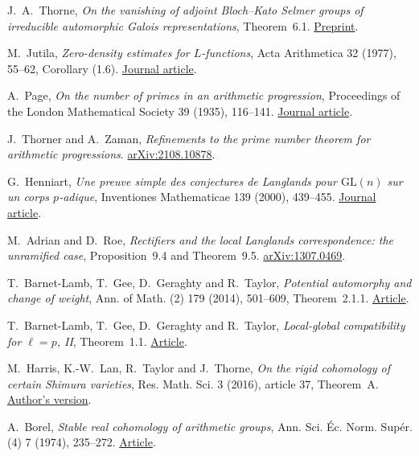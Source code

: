 J.~A.~Thorne, \emph{On the vanishing of adjoint Bloch--Kato
Selmer groups of irreducible automorphic Galois representations},
Theorem~6.1.
\href{https://arxiv.org/abs/2207.04925}{Preprint}.

M.~Jutila, \emph{Zero-density estimates for \(L\)-functions},
Acta Arithmetica 32 (1977), 55--62, Corollary (1.6).
\href{https://matwbn.icm.edu.pl/ksiazki/aa/aa32/aa3216.pdf}{Journal article}.

A.~Page, \emph{On the number of primes in an arithmetic progression},
Proceedings of the London Mathematical Society 39 (1935), 116--141.
\href{https://doi.org/10.1112/plms/s2-39.1.116}{Journal article}.

J.~Thorner and A.~Zaman, \emph{Refinements to the prime number theorem
for arithmetic progressions}.
\href{https://arxiv.org/abs/2108.10878}{arXiv:2108.10878}.

G.~Henniart, \emph{Une preuve simple des conjectures de Langlands pour
\(\mathrm{GL}(n)\) sur un corps \(p\)-adique}, Inventiones
Mathematicae 139 (2000), 439--455.
\href{https://doi.org/10.1007/s002220050012}{Journal article}.

M.~Adrian and D.~Roe, \emph{Rectifiers and the local Langlands
correspondence: the unramified case}, Proposition~9.4 and Theorem~9.5.
\href{https://arxiv.org/abs/1307.0469}{arXiv:1307.0469}.

T.~Barnet-Lamb, T.~Gee, D.~Geraghty and R.~Taylor,
\emph{Potential automorphy and change of weight},
Ann. of Math. (2) 179 (2014), 501--609, Theorem~2.1.1.
\href{https://annals.math.princeton.edu/wp-content/uploads/annals-v179-n2-p03-p.pdf#page=38}{Article}.

T.~Barnet-Lamb, T.~Gee, D.~Geraghty and R.~Taylor,
\emph{Local-global compatibility for \(\ell=p\), II}, Theorem~1.1.
\href{https://virtualmath1.stanford.edu/~rltaylor/lg2.pdf#page=6}{Article}.

M.~Harris, K.-W.~Lan, R.~Taylor and J.~Thorne,
\emph{On the rigid cohomology of certain Shimura varieties},
Res. Math. Sci. 3 (2016), article 37, Theorem~A.
\href{https://arxiv.org/abs/1411.6717}{Author's version}.

A.~Borel, \emph{Stable real cohomology of arithmetic groups},
Ann. Sci. \'{E}c. Norm. Sup\'{e}r. (4) 7 (1974), 235--272.
\href{https://www.numdam.org/item/10.24033/asens.1269.pdf}{Article}.

